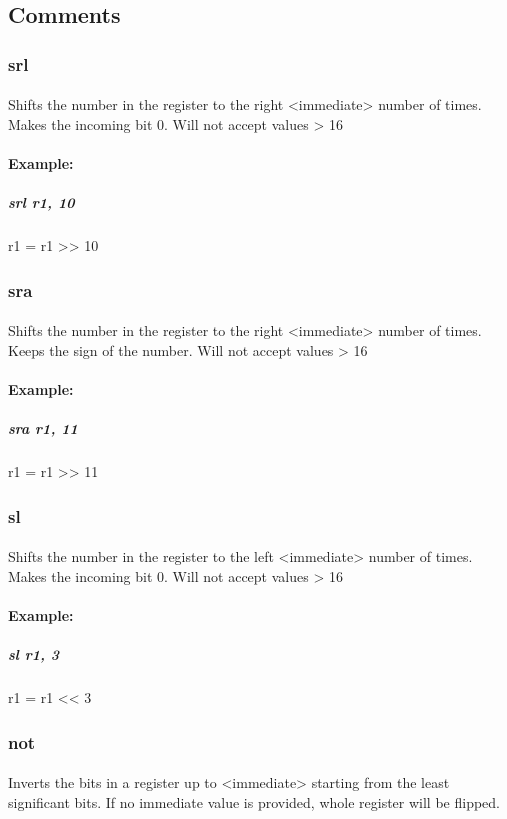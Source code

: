 \documentclass[a4paper]{article}
\begin{document}
\subsection{Comments}
\subsubsection{srl}
\paragraph{} Shifts the number in the register to the right <immediate> number of times. Makes the incoming bit 0. Will not accept values > 16
\paragraph{Example:} 
\subparagraph{srl r1, 10} r1 = r1 >> 10

\subsubsection{sra}
\paragraph{} Shifts the number in the register to the right <immediate> number of times. Keeps the sign of the number. Will not accept values > 16
\paragraph{Example:}
\subparagraph{sra r1, 11} r1 = r1 >> 11

\subsubsection{sl}
\paragraph{} Shifts the number in the register to the left <immediate> number of times. Makes the incoming bit 0. Will not accept values > 16
\paragraph{Example:} 
\subparagraph{sl r1, 3} r1 = r1 << 3

\subsubsection{not}
\paragraph{} Inverts the bits in a register up to <immediate> starting from the least significant bits. If no immediate value is provided, whole register will be flipped.
\end{document}
